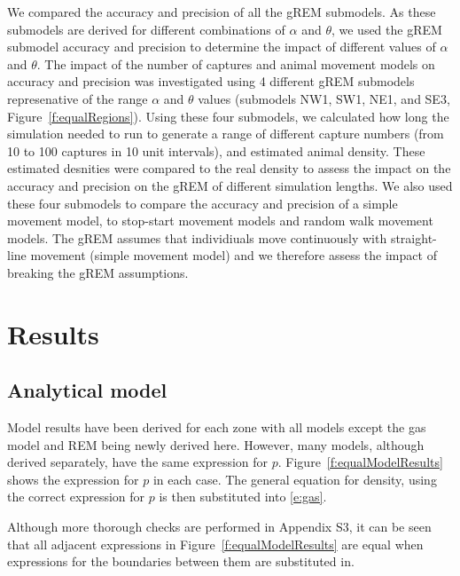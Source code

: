 \documentclass[a4paper,10pt,reqno,oneside]{amsart}
\begin{document}
We compared the accuracy and precision of all the gREM submodels. As these submodels are derived for different combinations of $\alpha$ and $\theta$, we used the gREM submodel accuracy and precision to determine the impact of different values of $\alpha$ and $\theta$. The impact of the number of captures and animal movement models on accuracy and precision was investigated using 4 different gREM submodels represenative of the range $\alpha$ and $\theta$ values (submodels NW1, SW1, NE1, and SE3, Figure~\ref{f:equalRegions}). Using these four submodels, we calculated how long the simulation needed to run to generate a range of different capture numbers (from 10 to 100 captures in 10 unit intervals), and estimated animal density. These estimated desnities were compared to the real density to assess the impact on the accuracy and precision on the gREM of different simulation lengths. We also used these four submodels to compare the accuracy and precision of a simple movement model, to stop-start movement models and random walk movement models. The gREM assumes that individiuals move continuously with straight-line movement (simple movement model) and we therefore assess the impact of breaking the gREM assumptions. 


\section{Results}

\subsection{Analytical model}

Model results have been derived for each zone with all models except the gas model and REM being newly derived here. However, many models, although derived separately, have the same expression for $p$. Figure~\ref{f:equalModelResults} shows the expression for $p$ in each case. The general equation for density, using the correct expression for $p$ is then substituted into \ref{e:gas}.

Although more thorough checks are performed in Appendix S3, it can be seen that all adjacent expressions in Figure~\ref{f:equalModelResults} are equal when expressions for the boundaries between them are substituted in.
\end{document}
